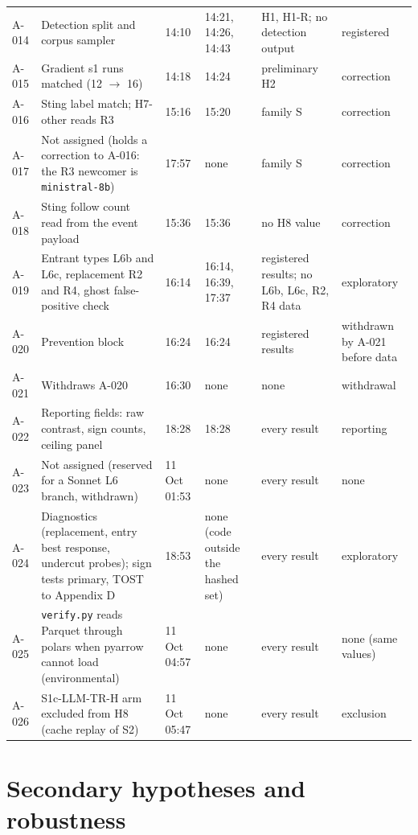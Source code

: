 \documentclass[11pt,a4paper]{article}
\begin{document}
{\begin{tabularx}{\linewidth}{@{}LLLLLL@{}}
A-014 & Detection split and corpus sampler & 14:10 & 14:21, 14:26, 14:43 & H1, H1-R; no detection output & registered \\
A-015 & Gradient s1 runs matched (12 $\rightarrow$ 16) & 14:18 & 14:24 & preliminary H2 & correction \\
A-016 & Sting label match; H7-other reads R3 & 15:16 & 15:20 & family S & correction \\
A-017 & Not assigned (holds a correction to A-016: the R3 newcomer is \texttt{ministral-\allowbreak{}8b}) & 17:57 & none & family S & correction \\
A-018 & Sting follow count read from the event payload & 15:36 & 15:36 & no H8 value & correction \\
A-019 & Entrant types L6b and L6c, replacement R2 and R4, ghost false-positive check & 16:14 & 16:14, 16:39, 17:37 & registered results; no L6b, L6c, R2, R4 data & exploratory \\
A-020 & Prevention block & 16:24 & 16:24 & registered results & withdrawn by A-021 before data \\
A-021 & Withdraws A-020 & 16:30 & none & none & withdrawal \\
A-022 & Reporting fields: raw contrast, sign counts, ceiling panel & 18:28 & 18:28 & every result & reporting \\
A-023 & Not assigned (reserved for a Sonnet L6 branch, withdrawn) & 11 Oct 01:53 & none & every result & none \\
A-024 & Diagnostics (replacement, entry best response, undercut probes); sign tests primary, TOST to Appendix D & 18:53 & none (code outside the hashed set) & every result & exploratory \\
A-025 & \texttt{verify.\allowbreak{}py} reads Parquet through polars when pyarrow cannot load (environmental) & 11 Oct 04:57 & none & every result & none (same values) \\
A-026 & S1c-LLM-TR-H arm excluded from H8 (cache replay of S2) & 11 Oct 05:47 & none & every result & exclusion \\
\end{tabularx}
}

\section{Secondary hypotheses and robustness}
\end{document}
